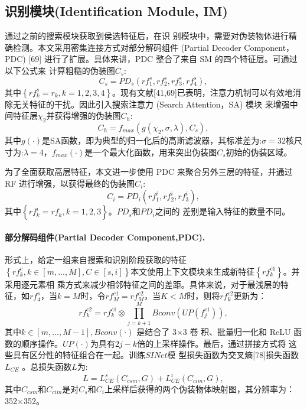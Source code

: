 \documentclass[final]{cvpr}
\newcommand{\mypara}[1]{\paragraph{#1.}}
\begin{document}
\subsection{识别模块(Identification Module, IM)}
通过之前的搜索模块获取到侯选特征后，在识 别模块中，需要对伪装物体进行精确检测。本文采用密集连接方式对部分解码组件 (Partial Decoder Component，PDC) [69] 进行了扩展。具体来讲，PDC 整合了来自 SM 的四个特征层。可通过以下公式来 计算粗糙的伪装图$C_{s}$:
\begin{equation}\label{equ:Partial_Decoder_Component}
   C_{s} =PD_{s} \left ( rf_{1}^{s}, rf_{2}^{s}, rf_{3}^{s}, rf_{4}^{s}\right),
\end{equation}
其中$\left\{rf_{k}^{s}=r_{k},k=1,2,3,4\right\}$。现有文献[41,69]已表明，注意力机制可以有效地消除无关特征的干扰。因此引入搜索注意力 (Search Attention，SA) 模块 来增强中间特征层$\chi_{2}$并获得增强的伪装图$C_{h}$:
\begin{equation}\label{equ:Search_Attention}
   C_{h} = f_{max}\left ( g(\chi_{2}, \sigma, \lambda), C_{s} \right ),
\end{equation}
其中$g\left ( \cdot \right ) $是SA函数，即为典型的归一化后的高斯滤波器，其标准差为:$\sigma = 32 $核尺寸为:$ \lambda = 4$，$f_{max}\left ( \cdot \right )$是一个最大化函数，用来突出伪装图$C_{s}$初始的伪装区域。


为了全面获取高层特征，本文进一步使用 PDC 来聚合另外三层的特征，并通过 RF 进行增强，以获得最终的伪装图$C_{i}$:
\begin{equation}\label{equ:RF_Partial_Decoder_Component}
   C_{i} = PD_{i} \left ( rf_{1}^{i}, rf_{2}^{i}, rf_{3}^{i} \right),
\end{equation}
其中$\left \{ rf_{k}^{i} = rf_{k},k=1,2,3 \right \}$。$PD_{s}$和$PD_{i}$之间的
差别是输入特征的数量不同。
\mypara{部分解码组件(Partial Decoder Component,PDC)}
形式上，给定一组来自搜索和识别阶段获取的特征$\left \{ rf_{k}^{c} , k\in \left [ m,...,M \right ]   ,C \in \left [ s,i \right ] \right \} $本文使用上下文模块来生成新特征$\left \{ rf_{k}^{c1} \right \} $。并采用逐元素相
乘方式来减少相邻特征之间的差距。具体来说，对于最浅层的特征，如$rf_{4}^{s}$，当$k=M$时，令$rf_{M}^{c1}=rf_{M}^{c2}$，当$K<M$时，则将$rf_{k}^{c2}$更新为：
\begin{equation}\label{equ:PDC_refresh}
   rf_{k}^{c2} =rf_{k}^{c1} \otimes  {\textstyle \prod_{j=k+1}^{M}}Bconv\left ( UP\left ( f_{j}^{c1}  \right )  \right )  ,
\end{equation}
其中$k\in \left [ m,...,M−1 \right ],Bconv(\cdot) $ 是结合了 3×3 卷 积、批量归一化和 ReLU 函数的顺序操作。$UP(\cdot) $为具有$2j−k$倍的上采样操作。最后，通过拼接方式将 这些具有区分性的特征组合在一起。训练$SINet$模 型损失函数为交叉熵[78]损失函数$L_{CE}$ 。总损失函数$L$为:
\begin{equation}\label{equ:L_CE_loss}
   L=L_{CE}^{s}\left ( C_{csm},G \right )  +L_{CE}^{i} \left ( C_{cim},G \right ) ,
\end{equation}
其中$C_{csm}$和$C_{cim}$是对$C_{s}$和$C_{i}$上采样后获得的两个伪装物体映射图，其分辨率为：352×352。
\end{document}
